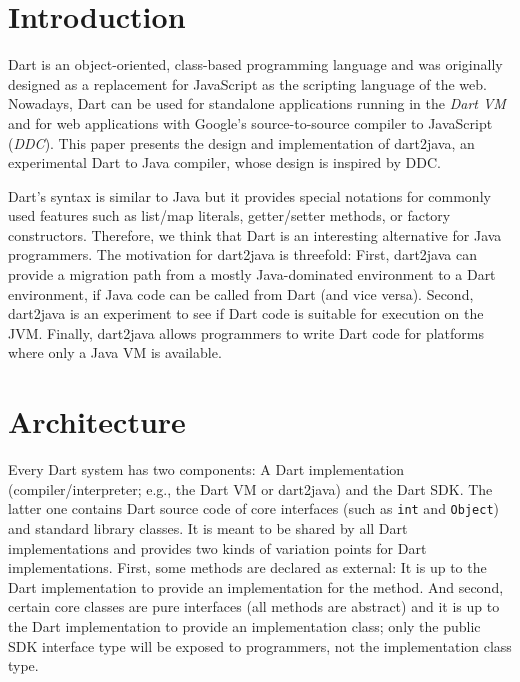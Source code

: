 \documentclass[sigplan]{acmart}
\begin{document}

\maketitle

\section{Introduction}
Dart is an object-oriented, class-based programming language and was originally designed as a replacement for JavaScript as the scripting language of the web. Nowadays, Dart can be used for standalone applications running in the \emph{Dart VM} and for web applications with Google's source-to-source compiler to JavaScript (\emph{DDC}). This paper presents the design and implementation of dart2java, an experimental Dart to Java compiler, whose design is inspired by DDC.

Dart's syntax is similar to Java but it provides special notations for commonly used features such as list/map literals, getter/setter methods, or factory constructors. Therefore, we think that Dart is an interesting alternative for Java programmers. The motivation for dart2java is threefold: First, dart2java can provide a migration path from a mostly Java-dominated environment to a Dart environment, if Java code can be called from Dart (and vice versa). Second, dart2java is an experiment to see if Dart code is suitable for execution on the JVM. Finally, dart2java allows programmers to write Dart code for platforms where only a Java VM is available. %
 
\section{Architecture}
Every Dart system has two components: A Dart implementation (compiler/interpreter; e.g., the Dart VM or dart2java) and the Dart SDK. The latter one contains Dart source code of core interfaces (such as \texttt{int} and \texttt{Object}) and standard library classes. It is meant to be shared by all Dart implementations and provides two kinds of variation points for Dart implementations. First, some methods are declared as external: It is up to the Dart implementation to provide an implementation for the method. And second, certain core classes are pure interfaces (all methods are abstract) and it is up to the Dart implementation to provide an implementation class; only the public SDK interface type will be exposed to programmers, not the implementation class type.
\end{document}
